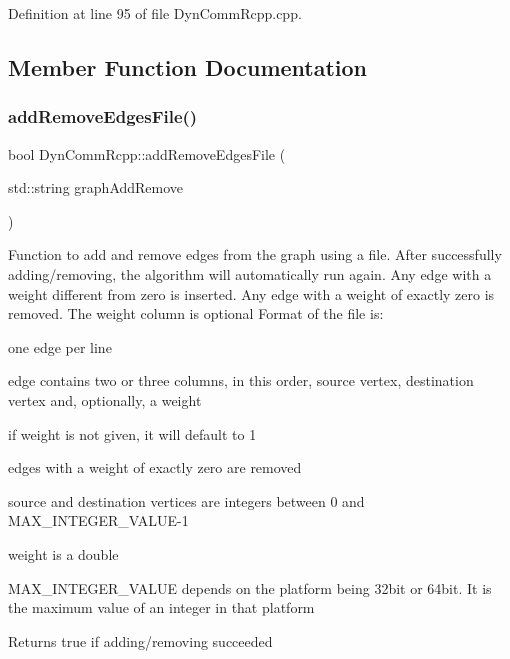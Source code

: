 Definition at line 95 of file Dyn\+Comm\+Rcpp.\+cpp.



\subsection{Member Function Documentation}
\mbox{\label{classDynCommRcpp_a9080af5a73f77db6eff4d7a41596902a}} 
\subsubsection{\texorpdfstring{add\+Remove\+Edges\+File()}{addRemoveEdgesFile()}}
{\footnotesize\ttfamily bool Dyn\+Comm\+Rcpp\+::add\+Remove\+Edges\+File (\begin{DoxyParamCaption}\item[{std\+::string}]{graph\+Add\+Remove }\end{DoxyParamCaption})\hspace{0.3cm}{\ttfamily [inline]}}

Function to add and remove edges from the graph using a file. After successfully adding/removing, the algorithm will automatically run again. Any edge with a weight different from zero is inserted. Any edge with a weight of exactly zero is removed. The weight column is optional Format of the file is\+:
\begin{DoxyItemize}
\item one edge per line
\item edge contains two or three columns, in this order, source vertex, destination vertex and, optionally, a weight
\item if weight is not given, it will default to 1
\item edges with a weight of exactly zero are removed
\item source and destination vertices are integers between 0 and M\+A\+X\+\_\+\+I\+N\+T\+E\+G\+E\+R\+\_\+\+V\+A\+L\+U\+E-\/1
\item weight is a double
\item M\+A\+X\+\_\+\+I\+N\+T\+E\+G\+E\+R\+\_\+\+V\+A\+L\+UE depends on the platform being 32bit or 64bit. It is the maximum value of an integer in that platform \begin{DoxyReturn}{Returns}
true if adding/removing succeeded 
\end{DoxyReturn}

\end{DoxyItemize}

